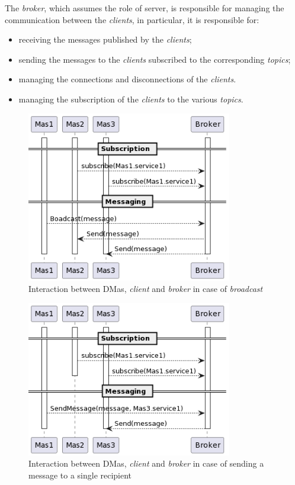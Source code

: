 The \textit{broker}, which assumes the role of server, is responsible for managing the communication between the \textit{clients}, in particular, it is responsible for:
\begin{itemize}
    \item receiving the messages published by the \textit{clients};
    \item sending the messages to the \textit{clients} subscribed to the corresponding \textit{topics};
    \item managing the connections and disconnections of the \textit{clients}.
    \item managing the subscription of the \textit{clients} to the various \textit{topics}.
\end{itemize}

\begin{figure}[ht!]
    \centering
    \includegraphics[width=0.8\textwidth]{figures/interaction-broadcast.png}
    \caption{Interaction between DMas, \textit{client} and \textit{broker} in case of \textit{broadcast}}
    \label{fig:interaction-broadcast}
\end{figure}

\begin{figure}[ht!]
    \centering
    \includegraphics[width=0.8\textwidth]{figures/interaction-sendmessage.png}
    \caption{Interaction between DMas, \textit{client} and \textit{broker} in case of sending a message to a single recipient}
    \label{fig:interaction-sendmessage}
\end{figure}

